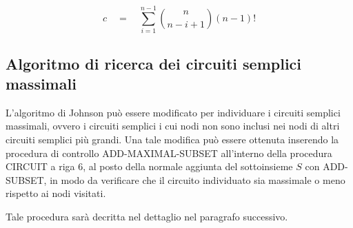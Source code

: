 \begin{equation*}
    c \quad = \quad \sum_{i = 1}^{n-1} \binom{n}{n-i+1} (n-1)!
\end{equation*}

\subsection{Algoritmo di ricerca dei circuiti semplici massimali} \label{sec:maximal-circuits}
L'algoritmo di Johnson pu\`o essere modificato per individuare i circuiti semplici massimali, ovvero i circuiti
semplici i cui nodi non sono inclusi nei nodi di altri circuiti semplici pi\`u grandi.\newline
Una tale modifica pu\`o essere ottenuta inserendo la procedura di controllo ADD-MAXIMAL-SUBSET all'interno della
procedura CIRCUIT a riga 6, al posto della normale aggiunta del sottoinsieme $S$ con ADD-SUBSET, in modo da verificare
che il circuito individuato sia massimale o meno rispetto ai nodi visitati.

Tale procedura sar\`a decritta nel dettaglio nel paragrafo successivo.


